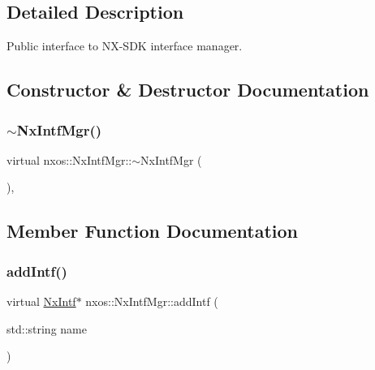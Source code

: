 \subsection{Detailed Description}
Public interface to N\+X-\/\+S\+DK interface manager. 

\subsection{Constructor \& Destructor Documentation}
\mbox{\label{classnxos_1_1_nx_intf_mgr_a15014eefb460c6f52cb0244de4b03355}} 
\subsubsection{\texorpdfstring{$\sim$\+Nx\+Intf\+Mgr()}{~NxIntfMgr()}}
{\footnotesize\ttfamily virtual nxos\+::\+Nx\+Intf\+Mgr\+::$\sim$\+Nx\+Intf\+Mgr (\begin{DoxyParamCaption}{ }\end{DoxyParamCaption})\hspace{0.3cm}{\ttfamily [inline]}, {\ttfamily [virtual]}}



\subsection{Member Function Documentation}
\mbox{\label{classnxos_1_1_nx_intf_mgr_a818e4d019413e8111cbb9610e465f714}} 
\subsubsection{\texorpdfstring{add\+Intf()}{addIntf()}}
{\footnotesize\ttfamily virtual \mbox{\hyperlink{classnxos_1_1_nx_intf}{Nx\+Intf}}$\ast$ nxos\+::\+Nx\+Intf\+Mgr\+::add\+Intf (\begin{DoxyParamCaption}\item[{std\+::string}]{name }\end{DoxyParamCaption})\hspace{0.3cm}{\ttfamily [pure virtual]}}

